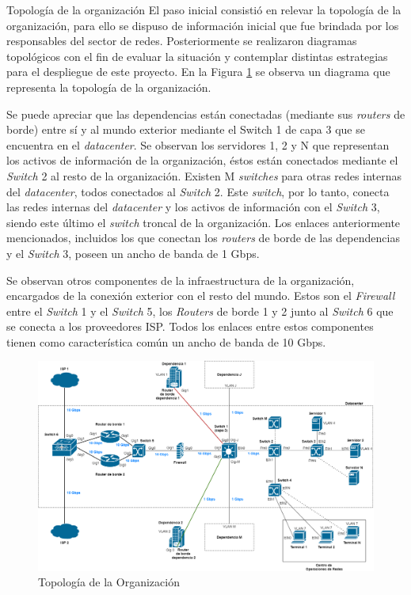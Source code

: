     \begin{section}{Topología de la organización}
    El paso inicial consistió en relevar la topología de la organización, para ello se dispuso de información inicial que fue brindada por los responsables del sector de redes. Posteriormente se realizaron diagramas topológicos con el fin de evaluar la situación y contemplar distintas estrategias para el despliegue de este proyecto.  
    En la Figura \ref{fig:iter1_top_unc} se observa un diagrama que representa la topología de la organización.\par
    Se puede apreciar que las dependencias están conectadas (mediante sus \textit{routers} de borde) entre sí y al mundo exterior mediante el Switch 1 de capa 3 que se encuentra en el \textit{datacenter}. Se observan los servidores 1, 2 y N que representan los activos de información de la organización, éstos están conectados mediante el \textit{Switch} 2 al resto de la organización. Existen M \textit{switches} para otras redes internas del \textit{datacenter}, todos conectados al \textit{Switch} 2. Este \textit{switch}, por lo tanto, conecta las redes internas del \textit{datacenter} y los activos de información con el \textit{Switch} 3, siendo este último el \textit{switch} troncal de la organización. Los enlaces anteriormente mencionados, incluidos los que conectan los \textit{routers} de borde de las dependencias y el \textit{Switch} 3, poseen un ancho de banda de 1 Gbps.\par
    Se observan otros componentes de la infraestructura de la organización, encargados de la conexión exterior con el resto del mundo. Estos son el \textit{Firewall} entre el \textit{Switch} 1 y el \textit{Switch} 5, los \textit{Routers} de borde 1 y 2 junto al \textit{Switch} 6 que se conecta a los proveedores ISP. Todos los enlaces entre estos componentes tienen como característica común un ancho de banda de 10 Gbps. \par
    \begin{figure}[H]
    \centering
    \includegraphics[width=1\textwidth]{./iteracion_1_imagenes/figura_topologia_UNC.png}
    \caption{Topología de la Organización}
    \label{fig:iter1_top_unc}
    \end{figure}
    \FloatBarrier
    \end{section}
